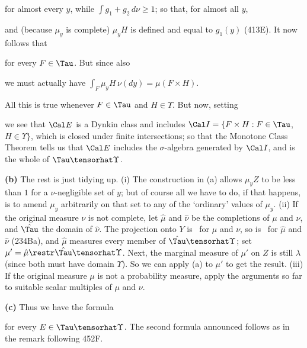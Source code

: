 {

\noindent for almost every $y$, while $\int g_1+g_2\,d\nu\ge 1$;  so that,
for almost all $y$,


\noindent and (because $\mu_y$ is complete) $\mu_yH$ is defined
and equal to $g_1(y)$ (413E).   It now follows that


\noindent for every $F\in\Tau$.   But since also



\noindent we must actually have $\int_F\mu_yH\,\nu(dy)=\mu(F\times H)$.

All this is true whenever $F\in\Tau$ and $H\in\Upsilon$.   But now,
setting


\noindent we see that $\Cal E$ is a Dynkin class and includes
$\Cal I=\{F\times H:F\in\Tau$, $H\in\Upsilon\}$, which is closed under
finite intersections;  so that the Monotone Class Theorem tells us that
$\Cal E$ includes the $\sigma$-algebra generated by $\Cal I$, and is the
whole of $\Tau\tensorhat\Upsilon$.

\medskip

{\bf (b)} The rest is just tidying up.
(i) The construction in (a) allows $\mu_yZ$ to be less than
$1$ for a
$\nu$-negligible set of $y$;  but of course all we have to do, if that
happens, is to amend $\mu_y$ arbitrarily on that set to any of the
`ordinary' values of $\mu_y$.
(ii) If the original measure $\nu$ is not complete, let $\hat\mu$ and
$\hat\nu$ be the completions of $\mu$ and $\nu$, and $\hat{\Tau}$ the
domain of $\hat\nu$.   The projection onto $Y$ is \imp\ for $\mu$ and
$\nu$, so is \imp\ for $\hat\mu$ and $\hat\nu$ (234Ba),
and $\hat\mu$ measures every member of $\hat\Tau\tensorhat\Upsilon$;
set $\mu'=\hat\mu\restr\hat\Tau\tensorhat\Upsilon$.   Next, the marginal
measure of $\mu'$ on $Z$ is still $\lambda$ (since both must have domain
$\Upsilon$).   So we can apply (a) to $\mu'$ to get the result.   (iii)
If the original measure $\mu$ is not a probability measure, apply the
arguments so far to suitable scalar multiples of $\mu$ and $\nu$.

\medskip

{\bf (c)} Thus we have the formula


\noindent for every $E\in\Tau\tensorhat\Upsilon$.   The second formula
announced follows as in the remark following 452F.
}%

